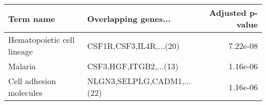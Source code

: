 \begin{tabular}{llr}
\toprule
                 Term name &       Overlapping genes... &  Adjusted p-value \\
\midrule
Hematopoietic cell lineage &    CSF1R,CSF3,IL4R,...(20) &          7.22e-08 \\
                   Malaria &     CSF3,HGF,ITGB2,...(13) &          1.16e-06 \\
   Cell adhesion molecules & NLGN3,SELPLG,CADM1,...(22) &          1.16e-06 \\
\bottomrule
\end{tabular}
